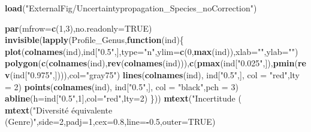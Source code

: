 \documentclass[
  11pt,
  french,
  A4paper,
  extrafontsizes,onecolumn,openright
  ]{memoir}
\newenvironment{Shaded}{\begin{snugshade}}{\end{snugshade}}
\newcommand{\KeywordTok}[1]{\textcolor[rgb]{0.13,0.29,0.53}{\textbf{#1}}}
\newcommand{\DataTypeTok}[1]{\textcolor[rgb]{0.13,0.29,0.53}{#1}}
\newcommand{\DecValTok}[1]{\textcolor[rgb]{0.00,0.00,0.81}{#1}}
\newcommand{\FloatTok}[1]{\textcolor[rgb]{0.00,0.00,0.81}{#1}}
\newcommand{\StringTok}[1]{\textcolor[rgb]{0.31,0.60,0.02}{#1}}
\newcommand{\OtherTok}[1]{\textcolor[rgb]{0.56,0.35,0.01}{#1}}
\newcommand{\ControlFlowTok}[1]{\textcolor[rgb]{0.13,0.29,0.53}{\textbf{#1}}}
\newcommand{\OperatorTok}[1]{\textcolor[rgb]{0.81,0.36,0.00}{\textbf{#1}}}
\newcommand{\NormalTok}[1]{#1}
\begin{document}
\begin{Shaded}
\begin{Highlighting}[]
\KeywordTok{load}\NormalTok{(}\StringTok{"ExternalFig/Uncertaintypropagation_Species_noCorrection"}\NormalTok{)}

\KeywordTok{par}\NormalTok{(}\DataTypeTok{mfrow=}\KeywordTok{c}\NormalTok{(}\DecValTok{1}\NormalTok{,}\DecValTok{3}\NormalTok{),}\DataTypeTok{no.readonly=}\OtherTok{TRUE}\NormalTok{)}
\KeywordTok{invisible}\NormalTok{(}\KeywordTok{lapply}\NormalTok{(Profile_Genus,}\ControlFlowTok{function}\NormalTok{(ind)\{}
  \KeywordTok{plot}\NormalTok{(}\KeywordTok{colnames}\NormalTok{(ind),ind[}\StringTok{"0.5"}\NormalTok{,],}\DataTypeTok{type=}\StringTok{"n"}\NormalTok{,}\DataTypeTok{ylim=}\KeywordTok{c}\NormalTok{(}\DecValTok{0}\NormalTok{,}\KeywordTok{max}\NormalTok{(ind)),}\DataTypeTok{xlab=}\StringTok{""}\NormalTok{,}\DataTypeTok{ylab=}\StringTok{""}\NormalTok{)}
  \KeywordTok{polygon}\NormalTok{(}\KeywordTok{c}\NormalTok{(}\KeywordTok{colnames}\NormalTok{(ind),}\KeywordTok{rev}\NormalTok{(}\KeywordTok{colnames}\NormalTok{(ind))),}\KeywordTok{c}\NormalTok{(}\KeywordTok{pmax}\NormalTok{(ind[}\StringTok{"0.025"}\NormalTok{,]),}\KeywordTok{pmin}\NormalTok{(}\KeywordTok{rev}\NormalTok{(ind[}\StringTok{"0.975"}\NormalTok{,]))),}\DataTypeTok{col=}\StringTok{"gray75"}\NormalTok{)}
  \KeywordTok{lines}\NormalTok{(}\KeywordTok{colnames}\NormalTok{(ind), ind[}\StringTok{"0.5"}\NormalTok{,], }\DataTypeTok{col =} \StringTok{"red"}\NormalTok{,}\DataTypeTok{lty =} \DecValTok{2}\NormalTok{)}
  \KeywordTok{points}\NormalTok{(}\KeywordTok{colnames}\NormalTok{(ind), ind[}\StringTok{"0.5"}\NormalTok{,], }\DataTypeTok{col =} \StringTok{"black"}\NormalTok{,}\DataTypeTok{pch =} \DecValTok{3}\NormalTok{)}
  \KeywordTok{abline}\NormalTok{(}\DataTypeTok{h=}\NormalTok{ind[}\StringTok{"0.5"}\NormalTok{,}\DecValTok{1}\NormalTok{],}\DataTypeTok{col=}\StringTok{"red"}\NormalTok{,}\DataTypeTok{lty=}\DecValTok{2}\NormalTok{)}
\NormalTok{\}))}
\KeywordTok{mtext}\NormalTok{(}\StringTok{"Incertitude (%
\KeywordTok{mtext}\NormalTok{(}\StringTok{"Diversité équivalente (Genre)"}\NormalTok{,}\DataTypeTok{side=}\DecValTok{2}\NormalTok{,}\DataTypeTok{padj=}\DecValTok{1}\NormalTok{,}\DataTypeTok{cex=}\FloatTok{0.8}\NormalTok{,}\DataTypeTok{line=}\OperatorTok{-}\FloatTok{0.5}\NormalTok{,}\DataTypeTok{outer=}\OtherTok{TRUE}\NormalTok{)}
}
\end{Highlighting}
\end{Shaded}
\end{document}
